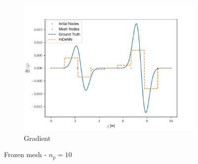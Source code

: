 \begin{figure}
\begin{subfigure}{0.3\linewidth}
        \includegraphics[width=\linewidth]{Figures/Solution_gradients_10_Frozen.pdf}
        \caption{Gradient}
    \end{subfigure}
    \caption{Frozen mesh - $n_p=10$}
    \label{fig:Fixed_Mesh10Float64}
\end{figure}

